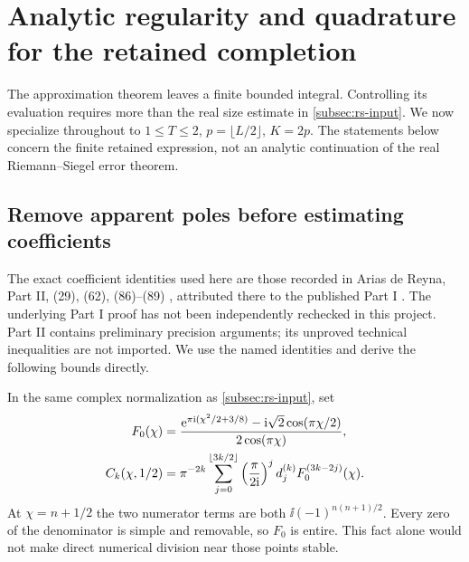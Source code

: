 \section{Analytic regularity and quadrature for the retained completion}
\label{sec:quadrature}
The approximation theorem leaves a finite bounded integral.
Controlling its evaluation requires more than the real size
estimate in \cref{subsec:rs-input}. We now specialize throughout
to \(1\le T\le2\), \(p=\lfloor L/2\rfloor\), \(K=2p\).
The statements below concern the finite retained expression, not
an analytic continuation of the real Riemann--Siegel error theorem.

\subsection{Remove apparent poles before estimating coefficients}
The exact coefficient identities used here are those recorded in
Arias de Reyna, Part II, (29), (62), (86)--(89)
\cite{ariasII}, attributed there to the published Part I
\cite{ariasI}. The underlying Part I proof has not been independently
rechecked in this project. Part II contains preliminary precision
arguments; its unproved technical inequalities are not imported.
We use the named identities and derive the following bounds directly.

In the same complex normalization as \cref{subsec:rs-input}, set
\begin{subequations}\label{eq:rs-coefficient-identity}
\begin{align}
 F_0(\chi)&=
 \frac{\mathrm e^{\pi\mathrm i(\chi^2/2+3/8)}
                     -\mathrm i\sqrt2\cos(\pi\chi/2)}{2\cos(\pi\chi)},\\
 C_k(\chi,1/2)&=\pi^{-2k}
  \sum_{j=0}^{\lfloor3k/2\rfloor}
       \left(\frac{\pi}{2\mathrm i}\right)^j
                  d_j^{(k)}F_0^{(3k-2j)}(\chi).
\end{align}
\end{subequations}
At \(\chi=n+1/2\) the two numerator terms are both
\(\ii(-1)^{n(n+1)/2}\). Every zero of the denominator is simple
and removable, so \(F_0\) is entire.
This fact alone would not make direct numerical division near
those points stable.

